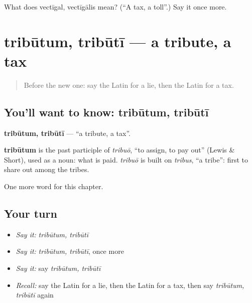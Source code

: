 \begin{tcolorbox}[breakable,colback=teal!4,colframe=teal!35!black,title={Before you move on}]
What does vectīgal, vectīgālis mean? (\textquotedblleft{}A tax, a toll\textquotedblright{}.) Say it once more.
\end{tcolorbox}
\section[tribūtum, tribūtī]{tribūtum, tribūtī — a tribute, a tax}

\label{lesson:LA-C190-tributum}



\begin{quote}
Before the new one: say the Latin for a lie, then the Latin for a tax.
\end{quote}

\subsection*{You'll want to know: tribūtum, tribūtī}
\textbf{tribūtum, tribūtī} — \textquotedblleft{}a tribute, a tax\textquotedblright{}.

\begin{cousinweb}
\textbf{tribūtum} is the past participle of \emph{tribuō}, \textquotedblleft{}to assign, to pay out\textquotedblright{} (Lewis \& Short), used as a noun: what is paid. \emph{tribuō} is built on \emph{tribus}, \textquotedblleft{}a tribe\textquotedblright{}: first to share out among the tribes.
\end{cousinweb}

\begin{grammarlens}[title={What you've built}]
One more word for this chapter.
\end{grammarlens}

\subsection*{Your turn}
\begin{itemize}
\raggedright
  \item \emph{Say it:} \emph{tribūtum, tribūtī}
  \item \emph{Say it:} \emph{tribūtum, tribūtī}, once more
  \item \emph{Say it:} say \emph{tribūtum, tribūtī}
  \item \emph{Recall:} say the Latin for a lie, then the Latin for a tax, then say \emph{tribūtum, tribūtī} again
\end{itemize}

